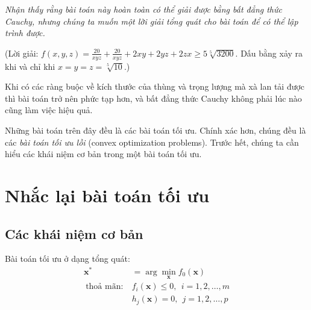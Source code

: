 \textit{Nhận thấy rằng bài toán này hoàn toàn có thể giải được bằng bất
đẳng thức Cauchy, nhưng chúng ta muốn một lời giải tổng quát cho bài toán để có thể lập trình được.}
 
(Lời giải:  
    $f(x, y, z)= \frac{20}{xyz} + \frac{20}{xyz} + 2xy + 2yz + 2zx
    \geq 5\sqrt[5]{3200} $.
Dấu bằng xảy ra khi và chỉ khi $x = y = z = \sqrt[5]{10}$.) 
 
Khi có các ràng buộc về kích thước của thùng và trọng lượng mà xà lan tải được
thì bài toán trở nên phức tạp hơn, và bất đẳng thức Cauchy không phải lúc nào cũng làm việc hiệu quả. 


Những bài toán trên đây đều là các bài toán tối ưu. Chính xác hơn, chúng đều
là các \textit{bài toán tối ưu lồi} ({convex optimization problems}). Trước hết, chúng ta cần hiểu các khái niệm cơ bản trong một bài toán tối ưu. 
 
 
\section{Nhắc lại bài toán tối ưu}
 
\subsection{Các khái niệm cơ bản}
Bài toán tối ưu ở dạng tổng quát:  
\begin{equation} 
\label{eqn:17_optprob1}
\begin{aligned}
\mathbf{x}^* &= \arg\min_{\mathbf{x}} f_0(\mathbf{x}) \\\ 
\text{thoả mãn:}~ & f_i(\mathbf{x}) \leq 0, ~~ i = 1, 2, \dots,m \\\ 
& h_j(\mathbf{x}) = 0, ~~ j = 1, 2, \dots, p 
\end{aligned}
\end{equation} 
 

 

